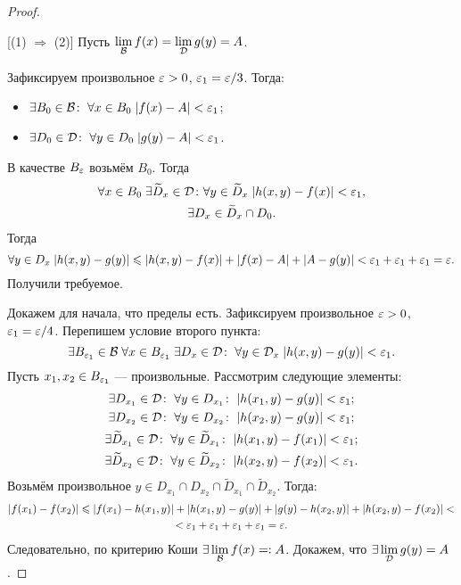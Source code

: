 \documentclass[a4paper, 12pt]{article}
\begin{document}
\begin{proof}\ 

    [(1) $\Rightarrow$ (2)] Пусть $\lim\limits_{\mathcal{B}} f(x) = \lim\limits_{\mathcal{D}} g(y) = A$. 
    \par Зафиксируем произвольное $\varepsilon > 0$, $\varepsilon_1 = \varepsilon/3$. Тогда:
    \begin{itemize}
        \item $\exists B_0\in \mathcal{B}\colon\; \forall x\in B_0\; |f(x) - A| <\varepsilon_1$;
        \item $\exists D_0\in \mathcal{D}\colon\; \forall y\in D_0\; |g(y) - A| <\varepsilon_1$.
    \end{itemize}
    В качестве $B_\varepsilon$ возьмём $B_0$. Тогда
    \begin{gather*}
        \forall x\in B_0\; \exists \widetilde{D}_x \in \mathcal{D}\colon \forall y \in \widetilde{D}_x\; |h(x,y) -f(x)| < \varepsilon_1,\\
        \exists D_x \in \widetilde{D}_x\cap D_0.
    \end{gather*}
    Тогда $$
    \forall y\in D_x\; |h(x,y) - g(y)| \leqslant |h(x,y) - f(x)| + |f(x) - A| + |A- g(y)| < \varepsilon_1 + \varepsilon_1 + \varepsilon_1 = \varepsilon.
    $$
    Получили требуемое.
    \par [$(2) \Rightarrow (1)$] Докажем для начала, что пределы есть. Зафиксируем произвольное $\varepsilon > 0$, $\varepsilon_1 = \varepsilon/4$. Перепишем условие второго пункта:
    $$
        \exists B_{\varepsilon_1} \in \mathcal{B}\; \forall x\in B_{\varepsilon_1}\; \exists D_x \in \mathcal{D}\colon\;  \forall y \in \mathcal{D}_x \; |h(x,y) - g(y)| < \varepsilon_1.
    $$
    Пусть $x_1, x_2 \in B_{\varepsilon_1}$ --- произвольные. Рассмотрим следующие элементы:
    \begin{gather*}
        \exists D_{x_1} \in \mathcal{D}\colon \; \forall y\in D_{x_1}\colon \; |h(x_1,y) - g(y)|<\varepsilon_1;\\
        \exists D_{x_2}\in \mathcal{D}\colon \; \forall y \in D_{x_2}\colon \; |h(x_2, y) - g(y)| < \varepsilon_1;\\
        \exists \widetilde{D}_{x_1}\in \mathcal{D}\colon \; \forall y\in \widetilde{D}_{x_1}\colon \; |h(x_1,y) - f(x_1)| < \varepsilon_1;\\
        \exists \widetilde{D}_{x_2} \in \mathcal{D}\colon \; \forall y\in \widetilde{D}_{x_2}\colon \; |h(x_2,y) - f(x_2)| < \varepsilon_1.\\
    \end{gather*}
    Возьмём произвольное $y\in D_{x_1} \cap D_{x_2} \cap \widetilde{D}_{x_1}\cap \widetilde{D}_{x_2}$. Тогда:
    \begin{gather}
        |f(x_1) - f(x_2)| \leqslant |f(x_1) - h(x_1, y)| + |h(x_1, y) - g(y)| + |g(y) - h(x_2, y)| + |h(x_2, y) - f(x_2)|<\\ < \varepsilon_1 + \varepsilon_1 + \varepsilon_1 + \varepsilon_1 = \varepsilon.
    \end{gather}
    Следовательно, по критерию Коши $\exists \lim\limits_{\mathcal{B}} f(x) =: A$. Докажем, что $\exists \lim \limits_{\mathcal{D}} g(y) = A$. 
    

\end{proof}
\end{document}
